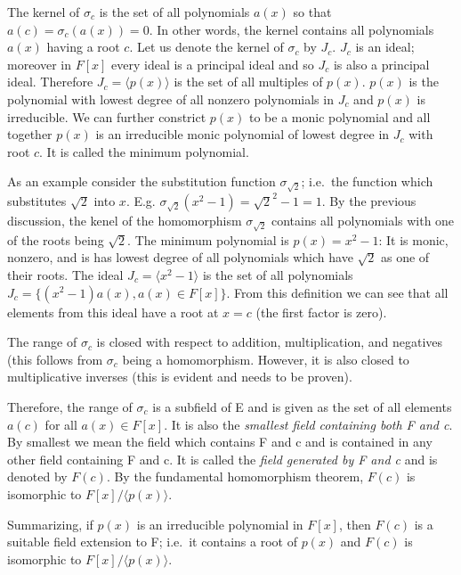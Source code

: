 The kernel of \(\sigma_c\) is the set of all polynomials \(a(x)\) so
that \(a(c) = \sigma_c(a(x)) = 0\). In other words, the kernel contains
all polynomials \(a(x)\) having a root \(c\). Let us denote the kernel
of \(\sigma_c\) by \(J_c\). \(J_c\) is an ideal; moreover in \(F[x]\)
every ideal is a principal ideal and so \(J_c\) is also a principal
ideal. Therefore \(J_c = \langle p(x) \rangle\) is the set of all
multiples of \(p(x)\). \(p(x)\) is the polynomial with lowest degree of
all nonzero polynomials in \(J_c\) and \(p(x)\) is irreducible. We can
further constrict \(p(x)\) to be a monic polynomial and all together
\(p(x)\) is an irreducible monic polynomial of lowest degree in \(J_c\)
with root \(c\). It is called the minimum polynomial.

As an example consider the substitution function \(\sigma_{\sqrt{2}}\);
i.e.~the function which substitutes \(\sqrt{2}\) into \(x\). E.g.
\(\sigma_{\sqrt{2}}(x^2-1) = \sqrt{2}^2-1 = 1\). By the previous
discussion, the kenel of the homomorphism \(\sigma_{\sqrt{2}}\) contains
all polynomials with one of the roots being \(\sqrt{2}\). The minimum
polynomial is \(p(x) = x^2-1\): It is monic, nonzero, and is has lowest
degree of all polynomials which have \(\sqrt{2}\) as one of their roots.
The ideal \(J_c = \langle x^2-1 \rangle\) is the set of all polynomials
\(J_c = \{(x^2-1) a(x), a(x) \in F[x]\}\). From this definition we can
see that all elements from this ideal have a root at \(x=c\) (the first
factor is zero).

The range of \(\sigma_c\) is closed with respect to addition,
multiplication, and negatives (this follows from \(\sigma_c\) being a
homomorphism. However, it is also closed to multiplicative inverses
(this is evident and needs to be proven).

Therefore, the range of \(\sigma_c\) is a subfield of E and is given as
the set of all elements \(a(c)\) for all \(a(x) \in F[x]\). It is also
the \emph{smallest field containing both F and c}. By smallest we mean
the field which contains F and c and is contained in any other field
containing F and c. It is called the \emph{field generated by F and c}
and is denoted by \(F(c)\). By the fundamental homomorphism theorem,
\(F(c)\) is isomorphic to \(F[x] / \langle p(x) \rangle\).

Summarizing, if \(p(x)\) is an irreducible polynomial in \(F[x]\), then
\(F(c)\) is a suitable field extension to F; i.e.~it contains a root of
\(p(x)\) and \(F(c)\) is isomorphic to \(F[x] / \langle p(x) \rangle\).

